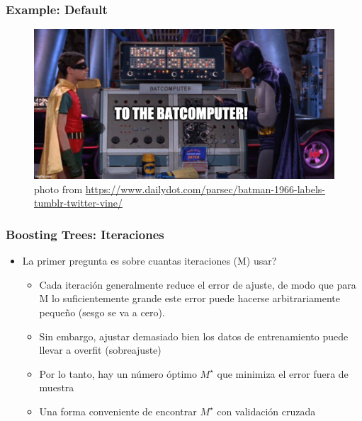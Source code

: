 \documentclass[
  shownotes,
  xcolor={svgnames},
  hyperref={colorlinks,citecolor=DarkBlue,linkcolor=andesred,urlcolor=DarkBlue}
  , aspectratio=169]{beamer}
\begin{document}
\begin{frame}[fragile]
\frametitle{Example: Default}
\begin{figure}[H] \centering
  \centering
  \includegraphics[scale=0.35]{figures/baticomputer_meme.jpg}
  \\
  \tiny photo from \url{https://www.dailydot.com/parsec/batman-1966-labels-tumblr-twitter-vine/}
\end{figure}
\end{frame}
\begin{frame}[fragile]
\frametitle{Boosting Trees: Iteraciones}

\begin{itemize}

\item La primer pregunta es sobre cuantas iteraciones (M) usar?
\begin{itemize}
\medskip
  
  \item Cada iteración generalmente reduce el error de ajuste, de modo que para M lo suficientemente grande este error puede hacerse arbitrariamente pequeño (sesgo se va a cero).
  \medskip
  \item Sin embargo, ajustar demasiado bien los datos de entrenamiento puede llevar a overfit (sobreajuste)
  \medskip
  \item Por lo tanto, hay un número óptimo $ M^\star$ que minimiza el error fuera de muestra
  \medskip
  \item Una forma conveniente de encontrar $M^\star$ con validación cruzada

  \end{itemize}
\end{itemize}

\end{frame}
\end{document}
